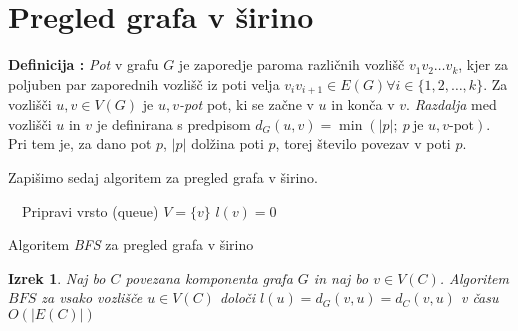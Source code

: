 \documentclass[a4paper, 10pt]{article}
\newtheorem{izr}{Izrek}
\newcounter{defcount}
\newenvironment{definicija}{\begin{flushleft}\stepcounter{defcount}\textbf{Definicija \arabic{defcount}:}}{\hfill\end{flushleft}}
\newcommand{\abs}[1]{\ensuremath{\lvert #1 \rvert}}
\newcommand{\pojem}[1]{\emph{#1}}
\begin{document}
	\section{Pregled grafa v širino}
	\begin{definicija}
		\pojem{Pot} v grafu $G$ je zaporedje paroma različnih vozlišč $v_1v_2\ldots v_k$, kjer za poljuben par zaporednih vozlišč iz poti velja $v_iv_{i+1} \in E(G) \forall i\in \{1, 2, \ldots, k\}$. Za vozlišči $u, v\in V(G)$ je \pojem{$u,v$-pot} pot, ki se začne v $u$ in konča v $v$. 
		\pojem{Razdalja} med vozlišči $u$ in $v$ je definirana s predpisom $d_G(u, v) = \min(\abs{p};~ p~\text{je $u, v$-pot})$. Pri tem je, za dano pot $p$, $\abs{p}$ dolžina poti $p$, torej število povezav v poti $p$.
	\end{definicija}
	Zapišimo sedaj algoritem za pregled grafa v širino.
		\begin{algorithm}[h!]
		\DontPrintSemicolon
		~~Pripravi vrsto (queue) $V = \{v\}$\;
		$l(v) = 0$\;
		\caption{Algoritem \pojem{BFS} za pregled grafa v širino}\label{alg:BFS}
	\end{algorithm}
	\begin{izr}
		Naj bo $C$ povezana komponenta grafa $G$ in naj bo $v\in V(C)$. Algoritem $BFS$ za vsako vozlišče $u\in V(C)$ določi $l(u) = d_G(v, u) = d_C(v, u)$ v času $O(\abs{E(C)})$
	\end{izr}
\end{document}
